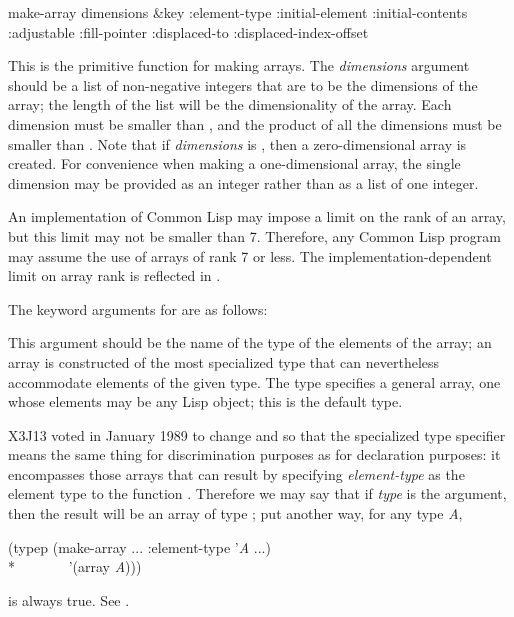 \begin{defun}[Function]
make-array dimensions &key :element-type :initial-element :initial-contents :adjustable :fill-pointer :displaced-to :displaced-index-offset

This is the primitive function for making arrays.  The {\it dimensions} argument
should be a list of non-negative integers
that are to be the dimensions of the array; the
length of the list will be the dimensionality of the array.  
Each dimension must be smaller than ,
and the product of all the dimensions must be smaller than
.
Note that if {\it dimensions} is {\nil}, then a zero-dimensional array is created.
For convenience when making a one-dimensional array, the single dimension
may be provided as an integer rather than as a list of one integer.

An implementation of Common Lisp may impose a limit on the rank of an array,
but this limit may not be smaller than 7.  Therefore, any Common Lisp
program may assume the use of arrays of rank 7 or less.
The implementation-dependent limit on array rank is reflected in
.

The keyword arguments for  are as follows:

\begin{flushdesc}
\item[\cd{:element-type}]
This argument
should be the name of the type of the elements of the array;
an array is constructed
of the most specialized type that can nevertheless accommodate
elements of the given type.
The type {\true} specifies a general array, one whose elements may
be any Lisp object; this is the default type.

\begin{new}
X3J13 voted in January 1989
to change  and 
so that the specialized  type specifier
means the same thing for discrimination purposes
as for declaration purposes: it encompasses those arrays
that can result by specifying {\it element-type} as the element type
to the function .  Therefore we may say
that if {\it type} is the  argument, then
the result will be an array of type ;
put another way, for any type {\it A},
\begin{lisp}
(typep (make-array ... :element-type '{\it A} ...) \\*
~~~~~~~'(array {\it A\/})))
\end{lisp}
is always true.
See .
\end{new}


\end{flushdesc}
\end{defun}
